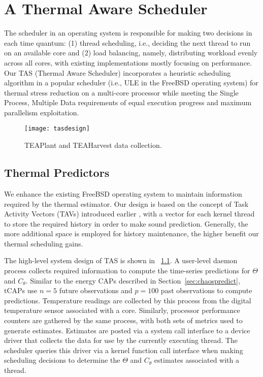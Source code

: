 %
%
\chapter{A Thermal Aware Scheduler}
\label{chp:schedule}
The scheduler in an operating system is responsible for making two
decisions in each time quantum: (1) thread scheduling, i.e., deciding
the next thread to run on an available core and (2) load balancing,
namely, distributing workload evenly across all cores, with existing
implementations mostly focusing on performance.  Our TAS (Thermal Aware
Scheduler) incorporates a heuristic scheduling algorithm in a popular
scheduler (i.e., ULE in the FreeBSD operating system) for thermal stress
reduction on a multi-core processor while meeting the Single Process,
Multiple Data requirements
of equal execution progress and maximum parallelism exploitation.

\begin{figure}[t] \centering
  \texttt{[image: tasdesign]}
  \caption{TEAPlant and TEAHarvest data collection.}
  \label{fig:teaplant}
\end{figure}

\section{Thermal Predictors}
\label{sec:therm-pred-design} 
We enhance the existing FreeBSD operating system to maintain information
required by the thermal estimator. Our design is based on the concept of
Task Activity Vectors (TAVs) introduced earlier \cite{Merkel2008a}, with
a vector for each kernel thread to store the required history in order
to make sound prediction.  Generally, the more additional space is
employed for history maintenance, the higher benefit our thermal
scheduling gains.

The high-level system design of TAS is shown in
\figurename~\ref{fig:teaplant}.  A user-level daemon process collects
required information to compute the time-series predictions for $\Theta$
and $C_{\theta}$. Similar to the energy CAPs described in
Section~\ref{sec:chaospredict}, tCAPs use $n=5$ future observations and
$p=100$ past observations to compute predictions. Temperature readings
are collected by this process from the digital temperature sensor
associated with a core.  Similarly, processor performance counters are
gathered by the same process, with both sets of metrics used to generate
estimates. Estimates are posted via a system call interface to a device
driver that collects the data for use by the currently executing thread.
The scheduler queries this driver via a kernel function call interface
when making scheduling decisions to determine the $\Theta$ and
$C_{\theta}$ estimates associated with a thread.

